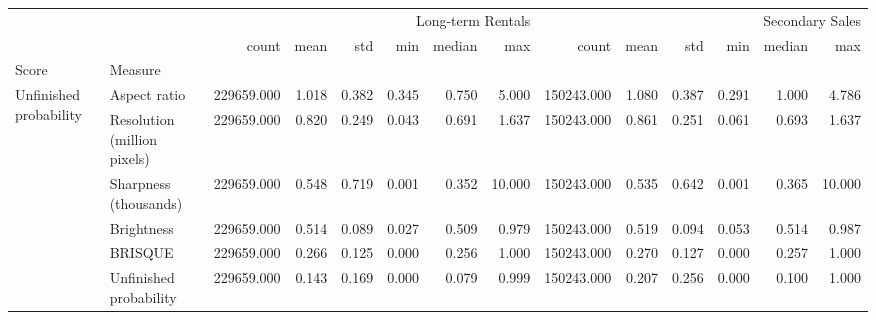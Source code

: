 \begin{tabular}{llrrrrrrrrrrrr}
\toprule
 &  & \multicolumn{6}{r}{Long-term Rentals} & \multicolumn{6}{r}{Secondary Sales} \\
 &  & count & mean & std & min & median & max & count & mean & std & min & median & max \\
Score & Measure &  &  &  &  &  &  &  &  &  &  &  &  \\
\midrule
\multirow[t]{6}{*}{Unfinished probability} & Aspect ratio & 229659.000 & 1.018 & 0.382 & 0.345 & 0.750 & 5.000 & 150243.000 & 1.080 & 0.387 & 0.291 & 1.000 & 4.786 \\
 & Resolution (million pixels) & 229659.000 & 0.820 & 0.249 & 0.043 & 0.691 & 1.637 & 150243.000 & 0.861 & 0.251 & 0.061 & 0.693 & 1.637 \\
 & Sharpness (thousands) & 229659.000 & 0.548 & 0.719 & 0.001 & 0.352 & 10.000 & 150243.000 & 0.535 & 0.642 & 0.001 & 0.365 & 10.000 \\
 & Brightness & 229659.000 & 0.514 & 0.089 & 0.027 & 0.509 & 0.979 & 150243.000 & 0.519 & 0.094 & 0.053 & 0.514 & 0.987 \\
 & BRISQUE & 229659.000 & 0.266 & 0.125 & 0.000 & 0.256 & 1.000 & 150243.000 & 0.270 & 0.127 & 0.000 & 0.257 & 1.000 \\
 & Unfinished probability & 229659.000 & 0.143 & 0.169 & 0.000 & 0.079 & 0.999 & 150243.000 & 0.207 & 0.256 & 0.000 & 0.100 & 1.000 \\
\cline{1-14}
\bottomrule
\end{tabular}
